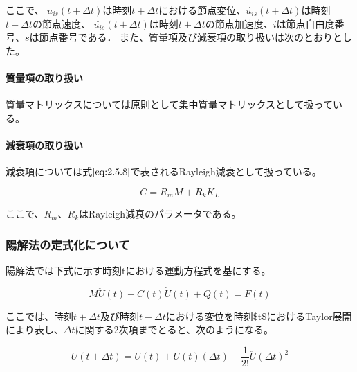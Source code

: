 \documentclass[a4paper,pandoc,ja=standard]{bxjsarticle}
\let\oldparagraph\paragraph
\renewcommand{\paragraph}[1]{\oldparagraph{#1}\mbox{}}
\begin{document}
ここで、
\(u_{is}(t+\Delta{t})\)は時刻\(t+\Delta{t}\)における節点変位、\(\dot{u_{is}}(t+\Delta{t})\)は時刻\(t+\Delta{t}\)の節点速度、
\(\ddot{u_{is}}(t+\Delta{t})\)は時刻\(t+\Delta{t}\)の節点加速度、\(i\)は節点自由度番号、\(s\)は節点番号である．
また、質量項及び減衰項の取り扱いは次のとおりとした。

\hypertarget{ux8ceaux91cfux9805ux306eux53d6ux308aux6271ux3044}{%
\paragraph{質量項の取り扱い}\label{ux8ceaux91cfux9805ux306eux53d6ux308aux6271ux3044}}

質量マトリックスについては原則として集中質量マトリックスとして扱っている。

\hypertarget{ux6e1bux8870ux9805ux306eux53d6ux308aux6271ux3044}{%
\paragraph{減衰項の取り扱い}\label{ux6e1bux8870ux9805ux306eux53d6ux308aux6271ux3044}}

減衰項については式\(\eqref{eq:2.5.8}\)で表されるRayleigh減衰として扱っている。

\begin{equation}
C = R_m M + R_k K_L
\label{eq:2.5.8}
\end{equation}

ここで、\(R_m\)、\(R_k\)はRayleigh減衰のパラメータである。

\hypertarget{ux967dux89e3ux6cd5ux306eux5b9aux5f0fux5316ux306bux3064ux3044ux3066}{%
\subsubsection{陽解法の定式化について}\label{ux967dux89e3ux6cd5ux306eux5b9aux5f0fux5316ux306bux3064ux3044ux3066}}

陽解法では下式に示す時刻tにおける運動方程式を基にする。

\begin{equation}
M \ddot{U}(t) + C (t) \dot{U}(t) + Q(t) = F(t)
\label{eq:2.5.9}
\end{equation}

ここでは、時刻\(t + \Delta t\)及び時刻\(t - \Delta t\)における変位を時刻\$t\$におけるTaylor展開により表し、\(\Delta t\)に関する2次項までとると、次のようになる。

\begin{equation}
U(t+\Delta{t}) = U(t)+\dot{U}(t)(\Delta{t})
+\frac{1}{2!}\ddot{U}(\Delta{t})^2
\label{eq:2.5.10}
\end{equation}
\end{document}

